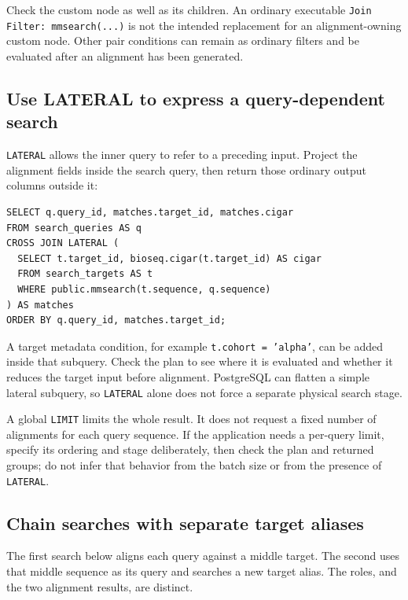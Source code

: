 Check the custom node as well as its children. An ordinary executable
\texttt{Join Filter: mmsearch(...)} is not the intended replacement for an
alignment-owning custom node. Other pair conditions can remain as ordinary
filters and be evaluated after an alignment has been generated.

\subsection{Use LATERAL to express a query-dependent search}

\texttt{LATERAL} allows the inner query to refer to a preceding input.
Project the alignment fields inside the search query, then return those
ordinary output columns outside it:

\par\noindent\begin{minipage}{\linewidth}
\begin{lstlisting}[style=bioseq-appendix-sql]
SELECT q.query_id, matches.target_id, matches.cigar
FROM search_queries AS q
CROSS JOIN LATERAL (
  SELECT t.target_id, bioseq.cigar(t.target_id) AS cigar
  FROM search_targets AS t
  WHERE public.mmsearch(t.sequence, q.sequence)
) AS matches
ORDER BY q.query_id, matches.target_id;
\end{lstlisting}
\end{minipage}

A target metadata condition, for example \texttt{t.cohort = 'alpha'}, can
be added inside that subquery. Check the plan to see where it is evaluated
and whether it reduces the target input before alignment. PostgreSQL can
flatten a simple lateral subquery, so \texttt{LATERAL} alone does not force
a separate physical search stage.

A global \texttt{LIMIT} limits the whole result. It does not request a
fixed number of alignments for each query sequence. If the application
needs a per-query limit, specify its ordering and stage deliberately, then
check the plan and returned groups; do not infer that behavior from the
batch size or from the presence of \texttt{LATERAL}.

\subsection{Chain searches with separate target aliases}

The first search below aligns each query against a middle target. The
second uses that middle sequence as its query and searches a new target
alias. The roles, and the two alignment results, are distinct.

